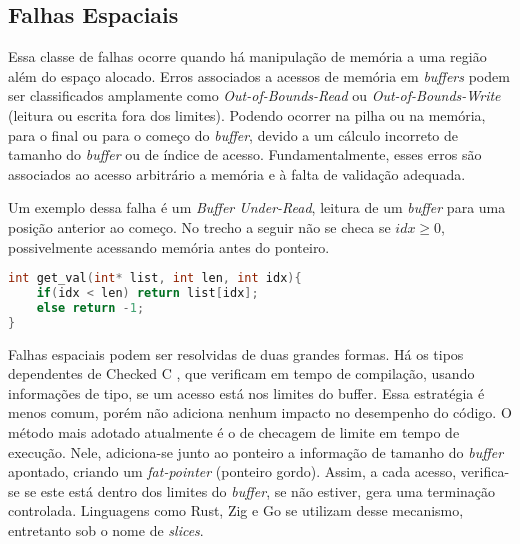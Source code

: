 
\subsection{Falhas Espaciais}
\label{sec:mem-error:spacial}

Essa classe de falhas ocorre quando há manipulação de memória a uma região 
além do espaço alocado. Erros associados a acessos de memória em \emph{buffers} 
podem ser classificados amplamente como \emph{Out-of-Bounds-Read} ou \emph{Out-of-Bounds-Write} 
(leitura ou escrita fora dos limites). 
Podendo ocorrer na pilha ou na memória, para o final ou para o começo do \emph{buffer}, 
devido a um cálculo incorreto de tamanho do \emph{buffer} ou de índice de acesso. 
Fundamentalmente, esses erros são associados ao acesso arbitrário a memória e 
à falta de validação adequada.

Um exemplo dessa falha é um \emph{Buffer Under-Read}, 
leitura de um \emph{buffer} para uma posição anterior ao começo. No trecho a seguir
não se checa se $idx \ge 0$, possivelmente acessando memória antes do ponteiro.

\begin{lstlisting}[language=C ,label={lst:spacial-error-c}, caption=Exemplo de uma Falha Espacial]
int get_val(int* list, int len, int idx){
	if(idx < len) return list[idx];
 	else return -1;
}
\end{lstlisting}

Falhas espaciais podem ser resolvidas de duas grandes formas. Há os tipos dependentes de Checked C \cite{CHECKEDC}, que verificam em tempo de compilação, usando informações de tipo, se um acesso está nos limites do buffer. Essa estratégia é menos comum, porém não adiciona nenhum impacto no desempenho do código. 
O método mais adotado atualmente é o de checagem de limite em tempo de execução. Nele, adiciona-se junto ao ponteiro a informação de tamanho do \emph{buffer} apontado, criando um \emph{fat-pointer} (ponteiro gordo). Assim, a cada acesso, verifica-se se este está dentro dos limites do \emph{buffer}, se não estiver, gera uma terminação controlada. Linguagens como Rust, Zig e Go se utilizam desse mecanismo, entretanto sob o nome de \emph{slices}.


